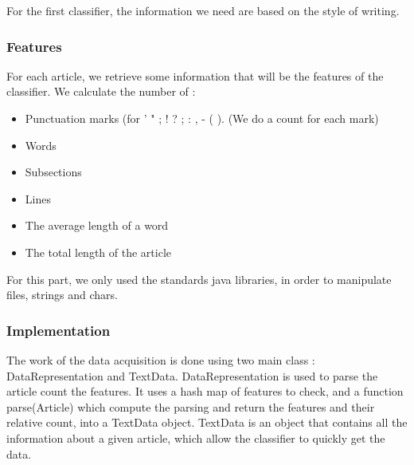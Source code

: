 For the first classifier, the information we need are based on the style of writing.

\subsubsection{Features}
\label{lab:data1}
For each article, we retrieve some information that will be the features of the classifier. We calculate the number of : 
\begin{itemize}
	\item Punctuation marks (for ' " ; ! ? ; : , - ( ). (We do a count for each mark)
	\item Words
	\item Subsections
	\item Lines
	\item The average length of a word
	\item The total length of the article
\end{itemize}

For this part, we only used the standards java libraries, in order to manipulate files, strings and chars. 

\subsubsection{Implementation}

The work of the data acquisition is done using two main class : DataRepresentation and TextData.
DataRepresentation is used to parse the article count the features. It uses a hash map of features to check, and a function parse(Article) which compute the parsing and return the features and their relative count, into a TextData object.
TextData is an object that contains all the information about a given article, which allow the classifier to quickly get the data. 

